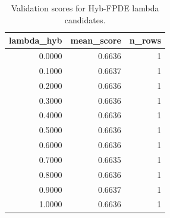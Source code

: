 \begin{table}[t]
\caption{Validation scores for Hyb-FPDE lambda candidates.}
\label{tab:lambda_distribution_computed}
\centering
\begin{tabular}{rrr}
\toprule
lambda\_hyb & mean\_score & n\_rows \\
\midrule
0.0000 & 0.6636 & 1 \\
0.1000 & 0.6637 & 1 \\
0.2000 & 0.6636 & 1 \\
0.3000 & 0.6636 & 1 \\
0.4000 & 0.6636 & 1 \\
0.5000 & 0.6636 & 1 \\
0.6000 & 0.6636 & 1 \\
0.7000 & 0.6635 & 1 \\
0.8000 & 0.6636 & 1 \\
0.9000 & 0.6637 & 1 \\
1.0000 & 0.6636 & 1 \\
\bottomrule
\end{tabular}

\end{table}
